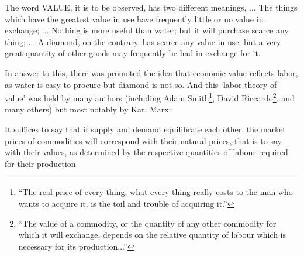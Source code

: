 
\begin{displayquote}
The word VALUE, it is to be observed, has two different meanings, ... The things which have the greatest value in use have frequently little or no value in exchange; ... Nothing is more useful than water; but it will purchase scarce any thing; ... A diamond, on the contrary, has scarce any value in use; but a very great quantity of other goods may frequently be had in exchange for it.\cite{Smith1Gutenberg}
\end{displayquote}

In answer to this, there was promoted the idea that economic value reflects labor, as water is easy to procure but diamond is not so.
And this `labor theory of value' was held by many authors (including Adam Smith\footnote{``The real price of every thing, what every thing really costs to the man who wants to acquire it, is the toil and trouble of acquiring it.''\cite{Smith1Gutenberg}}, David Riccardo\footnote{``The value of a commodity, or the quantity of any other commodity for which it will exchange, depends on the relative quantity of labour which is necessary for its production...''\cite[Section 1, Chapter 1]{Riccardo1Gutenberg}}, and many others) but most notably by Karl Marx:

\begin{displayquote}
It suffices to say that if supply and demand equilibrate each other, the market prices of commodities will correspond with their natural prices, that is to say with their values, as determined by the respective quantities of labour required for their production \cite[Chapter 2]{marx1910value}
\end{displayquote}

